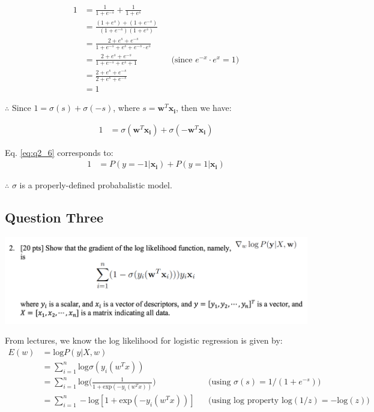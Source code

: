\begin{align}
    1 &= \frac{1}{1+e^{-s}} + \frac{1}{1+e^{s}}  \label{eq:q2_5} \nonumber \\
    &= \frac{(1+e^{s})+(1+e^{-s})}{(1+e^{-s})(1+e^{s})} \nonumber \\
    &= \frac{2+e^{s}+e^{-s}}{1+e^{-s}+e^{s}+e^{-s} \cdot e^{s}} \nonumber \\
    &= \frac{2+e^{s}+e^{-s}}{1+e^{-s}+e^{s}+1} && \text{(since $e^{-x} \cdot e^{x} = 1$)}\nonumber \\
    &= \frac{2+e^{s}+e^{-s}}{2+e^{s}+e^{-s}} \nonumber \\
    &=1
\end{align}

$\therefore$ Since $1 = \sigma(s) + \sigma(-s)$, where $s = \mathbf{w}^T \mathbf{x_i}$, then we have:

\begin{align}
    1 &= \sigma(\mathbf{w}^T \mathbf{x_i}) + \sigma(-\mathbf{w}^T \mathbf{x_i})  \label{eq:q2_6} 
\end{align}

Eq. \ref{eq:q2_6} corresponds to:
\begin{align}
    1 &= P(y=-1 | \mathbf{x_i}) + P(y=1 | \mathbf{x_i})  \label{eq:q2_7} 
\end{align}

$\therefore$ $\sigma$ is a properly-defined probabalistic model.

\subsection{Question Three}
\includegraphics[width=1\textwidth]{media/hw4_q3.png}

From lectures, we know the log likelihood for logistic regression is given by:
\begin{align}
    E(w) &= \text{log} P(y|X,w) \label{eq:q3_1} \nonumber \\
    &= \sum_{i=1}^{n} \text{log} \sigma(y_i (w^T x)) \nonumber \\
    &= \sum_{i=1}^{n} \text{log} \Bigg(\frac{1}{1+\text{exp}(-y_i (w^T x))} \Bigg) && \text{(using $\sigma(s)=1/(1+e^{-s})$)} \nonumber \\
    &= \sum_{i=1}^{n} -\text{log} [1+ \text{exp}(-y_i (w^T x))] && \text{(using log property $\text{log}(1/z)=-\text{log}(z)$)}
\end{align}

